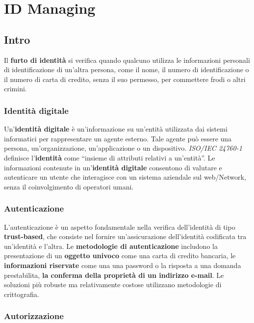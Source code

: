\chapter{ID Managing}

\section{Intro}

Il \textbf{furto di identità} si verifica quando qualcuno utilizza le informazioni
personali di identificazione di un'altra persona, come il nome, il numero di
identificazione o il numero di carta di credito, senza il suo permesso,
per commettere frodi o altri crimini.

\subsection{Identità digitale}

Un'\textbf{identità digitale} è un'informazione su un'entità utilizzata dai sistemi
informatici per rappresentare un agente esterno.
Tale agente può essere una persona, un'organizzazione, un'applicazione o un
dispositivo.
\textit{ISO/IEC 24760-1} definisce l'\textbf{identità} come
``insieme di attributi relativi a un'entità''.
Le informazioni contenute in un'\textbf{identità digitale} consentono di valutare
e autenticare un utente che interagisce con un sistema aziendale sul web/Network,
senza il coinvolgimento di operatori umani.

\subsection{Autenticazione}

L'autenticazione è un aspetto fondamentale nella verifica dell'identità
di tipo \textbf{trust-based}, che consiste nel fornire un'assicurazione
dell'identità codificata tra un'identità e l'altra.
Le \textbf{metodologie di autenticazione} includono la presentazione di
un \textbf{oggetto univoco} come una carta di credito bancaria,
le \textbf{informazioni riservate} come una una password o la risposta a una
domanda prestabilita, \textbf{la conferma della proprietà di un indirizzo e-mail}.
Le soluzioni più robuste ma relativamente costose utilizzano metodologie di
crittografia.

\subsection{Autorizzazione}


